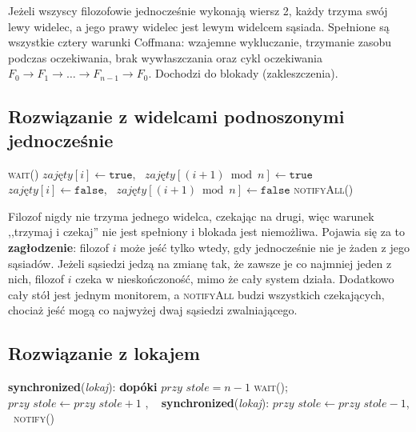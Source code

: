 \documentclass[11pt,a4paper]{article}
\newenvironment{algorytm}[1][htb]
  {\par\bigskip\floatname{algorithm}{}\renewcommand{\thealgorithm}{}
   \begin{algorithm}[#1]%
  }{\end{algorithm}\par\bigskip}
\begin{document}
Jeżeli wszyscy filozofowie jednocześnie wykonają wiersz 2, każdy trzyma swój lewy widelec,
a jego prawy widelec jest lewym widelcem sąsiada. Spełnione są wszystkie cztery warunki
Coffmana: wzajemne wykluczanie, trzymanie zasobu podczas oczekiwania, brak wywłaszczania
oraz cykl oczekiwania $F_0 \to F_1 \to \dots \to F_{n-1} \to F_0$. Dochodzi do blokady (zakleszczenia).

\subsection{Rozwiązanie z widelcami podnoszonymi jednocześnie}
\begin{algorytm}[H]
\begin{algorithmic}[1]
     
            \State \textsc{wait}()
        \EndWhile
        \State $\textit{zajęty}[i] \gets \texttt{true}$, \ $\textit{zajęty}[(i + 1) \bmod n] \gets \texttt{true}$
    \EndProcedure
     
        \State $\textit{zajęty}[i] \gets \texttt{false}$, \ $\textit{zajęty}[(i + 1) \bmod n] \gets \texttt{false}$
        \State \textsc{notifyAll}() 
    \EndProcedure
\end{algorithmic}
\caption{Widelce podnoszone jednocześnie}
\end{algorytm}

Filozof nigdy nie trzyma jednego widelca, czekając na drugi, więc warunek ,,trzymaj i czekaj''
nie jest spełniony i blokada jest niemożliwa. Pojawia się za to \textbf{zagłodzenie}: filozof $i$
może jeść tylko wtedy, gdy jednocześnie nie je żaden z jego sąsiadów. Jeżeli sąsiedzi jedzą
na zmianę tak, że zawsze je co najmniej jeden z nich, filozof $i$ czeka w nieskończoność,
mimo że cały system działa. Dodatkowo cały stół jest jednym monitorem, a \textsc{notifyAll}
budzi wszystkich czekających, chociaż jeść mogą co najwyżej dwaj sąsiedzi zwalniającego.

\subsection{Rozwiązanie z lokajem}
\begin{algorytm}[H]
\begin{algorithmic}[1]
        \State \textbf{synchronized}(\textit{lokaj}): \textbf{dopóki} $\textit{przy stole} = n - 1$ \textsc{wait}(); \ $\textit{przy stole} \gets \textit{przy stole} + 1$
        \State {}
        \State {}
    \EndProcedure
        \State {}, \ 
        \State \textbf{synchronized}(\textit{lokaj}): $\textit{przy stole} \gets \textit{przy stole} - 1$, \ \textsc{notify}()
    \EndProcedure
\end{algorithmic}
\caption{Rozwiązanie z lokajem}
\end{algorytm}
\end{document}
